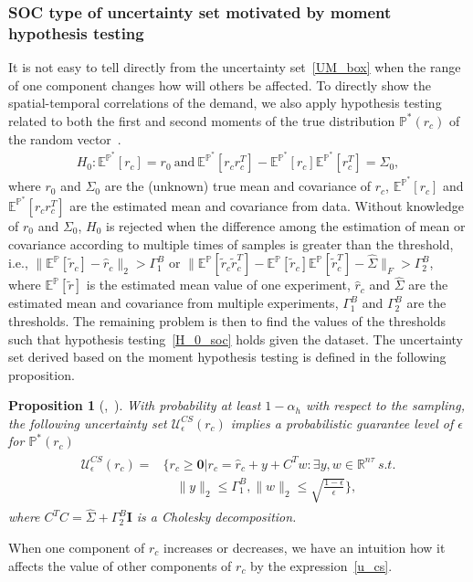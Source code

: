 \documentclass[10pt,twocolumn,twoside,english]{IEEEtran}
\newtheorem{proposition}{Proposition}
\begin{document}
\subsubsection{SOC type of uncertainty set motivated by moment hypothesis testing}\label{soc_uncertain}
It is not easy to tell directly from the uncertainty set~\eqref{UM_box} when the range of one component changes how will others be affected. To directly show the spatial-temporal correlations of the demand, we also apply hypothesis testing related to both the first and second moments of the true distribution $\mathbb{P}^*(r_c)$ of the random vector~\cite{SC_2003}. 
\begin{align}
H_0: \mathbb{E}^{\mathbb{P}^*} [r_c] = r_0 \ \text{and}\ \mathbb{E}^{\mathbb{P}^*} [r_c r_c^T] -\mathbb{E}^{\mathbb{P}^*} [r_c]\mathbb{E}^{\mathbb{P}^*} [r_c^T] =\Sigma_0,
\label{H_0_soc}
\end{align}
where $r_0$ and $\Sigma_0$ are the (unknown) true mean and covariance of $r_c$,  $\mathbb{E}^{\mathbb{P}^*} [r_c]$ and $\mathbb{E}^{\mathbb{P}^*} [r_c r_c^T]$ are the estimated mean and covariance from data. Without knowledge of $r_0$ and $\Sigma_0$, $H_0$ is rejected when the difference among the estimation of mean or covariance according to multiple times of samples is greater than the threshold, i.e., $\|\mathbb{E}^{\mathbb{P}}[\tilde{r}_c]-\hat{r}_c\|_2 > \Gamma_1^B$ or $\|\mathbb{E}^{\mathbb{P}}[\tilde{r}_c\tilde{r}_c^T] -\mathbb{E}^{\mathbb{P}}[\tilde{r}_c]\mathbb{E}^{\mathbb{P}}[\tilde{r}_c^T]-\hat{\Sigma}\|_F > \Gamma_2^B$, where $\mathbb{E}^{\mathbb{P}}[\tilde{r}]$ is the estimated mean value of one experiment, $\hat{r}_c$ and $\hat{\Sigma}$ are the estimated mean and covariance from multiple experiments, $\Gamma_1^B$ and $\Gamma_2^B$ are the thresholds. The remaining problem is then to find the values of the thresholds such that hypothesis testing~\eqref{H_0_soc} holds given the dataset. The uncertainty set derived based on the moment hypothesis testing is defined in the following proposition.
\begin{proposition}[\cite{datad_robust},~\cite{SC_2003}]
With probability at least $1-\alpha_h$ with respect to the sampling, the following uncertainty set $\mathcal{U}_{\epsilon}^{CS}(r_c)$ implies a probabilistic guarantee level of $\epsilon$ for $\mathbb{P}^*(r_c)$ 
\begin{align}
\begin{split}
\mathcal{U}_{\epsilon}^{CS} (r_c)=&\{r_c\geqslant \mathbf{0}| r_c= \hat{r}_c + y + C^T w: \exists y, w \in \mathbb{R}^{n\tau} \ s.t.\\
&\quad \|y\|_2 \leqslant \Gamma_1^B, \|w\|_2 \leqslant\sqrt{\frac{1-\epsilon}{\epsilon}}\},
\end{split}
\label{u_cs}
\end{align}
where $C^TC=\hat{\Sigma} + \Gamma_2^B \mathbf{I}$ is a Cholesky decomposition. 
\label{theorem_10}
\end{proposition} 
When one component of $r_c$ increases or decreases, we have an intuition how it affects the value of other components of $r_c$ by the expression~\eqref{u_cs}.
\end{document}

